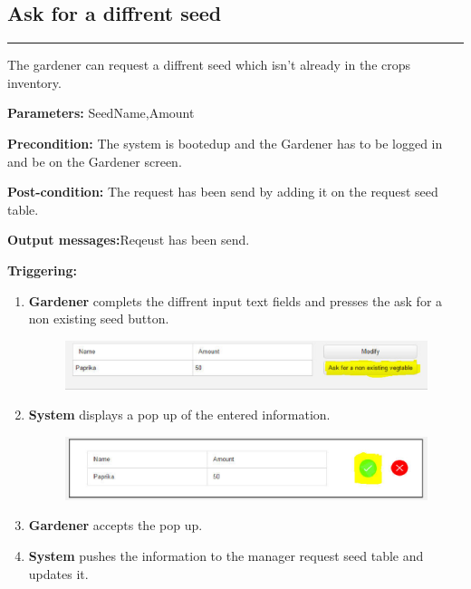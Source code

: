 
\label{chap:software-operations_Gardener}


\subsection{Ask for a diffrent seed}

\hrule
\hfill
\vspace{0.5cm}

\label{operation:Ask for a diffrent seed}

The gardener can request a diffrent seed which isn't already in the crops
inventory.
\begin{description}
\item \textbf{Parameters:} SeedName,Amount
\item \textbf{Precondition:} The system is bootedup and the Gardener has to be
logged in and be on the Gardener screen.
\item \textbf{Post-condition:} The request has been send by adding it on the
request seed table.
\item \item \textbf{Output messages:}Reqeust has been send.
\item \textbf{Triggering:}
\begin{enumerate}
\item \textbf{Gardener} complets the diffrent input text fields and presses
the ask for a non existing seed button.
\begin{figure}[H]
\includegraphics[width=1\textwidth]{images/AskForANonExistingVegtable.eps}
\end{figure}
\item \textbf{System} displays a pop up of the entered information.
\begin{figure}[H]
\includegraphics[width=1\textwidth]{images/AskForANonExistingVegtablePopUp.eps}
\end{figure}
\item \textbf{Gardener} accepts the pop up.
\item \textbf{System} pushes the information to the manager request seed table
and updates it.
\end{enumerate}
\end{description}

